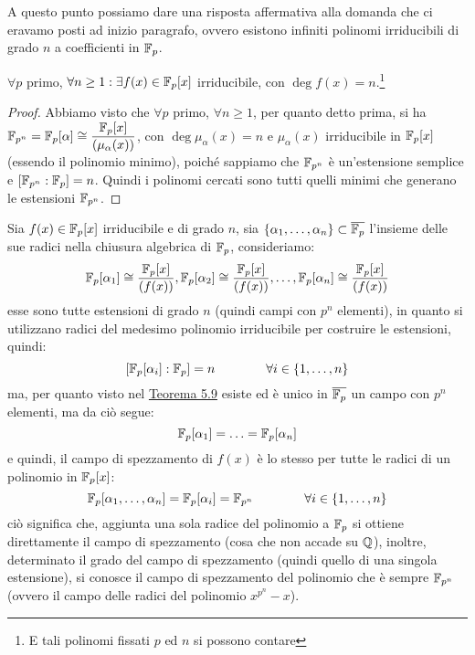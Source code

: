 \documentclass[11pt]{scrartcl}
\begin{document}
A questo punto possiamo dare una risposta affermativa alla domanda che ci eravamo posti ad inizio paragrafo, ovvero esistono infiniti
polinomi irriducibili di grado $n$ a coefficienti in ${\mathbb F}_p$.

\begin{corollary}
	$\forall p$ primo, $\forall n \geq 1: \exists f(x) \in {\mathbb F}_p[x]$ irriducibile, con $\deg f(x) = n$.\footnote{E tali polinomi fissati $p$ ed $n$ si possono contare}
\end{corollary}

\begin{proof}
	Abbiamo visto che $\forall p$ primo, $\forall n \geq 1$, per quanto detto prima, si ha $\mathbb{F}_{p^{n}} = {\mathbb F}_p[\alpha] \cong \displaystyle\frac{{\mathbb F}_p[x]}{(\mu_\alpha(x))}$,
	con $\deg\mu_\alpha(x)=n$ e $\mu_\alpha(x)$ irriducibile in ${\mathbb F}_p[x]$ (essendo il polinomio minimo), poiché sappiamo che $\mathbb{F}_{p^{n}}$ è un'estensione semplice e 
	$[\mathbb{F}_{p^{n}}:{\mathbb F}_p] = n$. Quindi i polinomi cercati sono tutti quelli minimi che generano le estensioni $\mathbb{F}_{p^{n}}$.
\end{proof}

\begin{remark}
Sia $f(x) \in {\mathbb F}_p[x]$ irriducibile e di grado $n$, sia $\{\alpha_1,\ldots,\alpha_n\} \subset \overline{{\mathbb F}_p}$
l'insieme delle sue radici nella chiusura algebrica di ${\mathbb F}_p$, consideriamo:
	\[ {\mathbb F}_p[\alpha_1] \cong \frac{{\mathbb F}_p[x]}{(f(x))}, {\mathbb F}_p[\alpha_2] \cong \frac{{\mathbb F}_p[x]}{(f(x))}, \ldots,
	{\mathbb F}_p[\alpha_n] \cong \frac{{\mathbb F}_p[x]}{(f(x))}
		\]
	esse sono tutte estensioni di grado $n$ (quindi campi con $p^n$ elementi), in quanto si utilizzano radici del medesimo polinomio irriducibile per costruire le estensioni, quindi:
		\[ [{\mathbb F}_p[\alpha_i] : {\mathbb F}_p] = n
		\qquad\qquad
		\forall i \in \{1,\ldots,n\}
			\] 
	ma, per quanto visto nel \hyperref[cf:5.9]{Teorema 5.9} esiste ed è unico in $\overline{{\mathbb F}_p}$ un campo con $p^n$ elementi, ma da ciò segue:
		\[{\mathbb F}_p[\alpha_1] = \ldots = {\mathbb F}_p[\alpha_n]
			\]
	e quindi, il campo di spezzamento di $f(x)$ è lo stesso per tutte le radici di un polinomio in ${\mathbb F}_p[x]$:
		\[ {\mathbb F}_p[\alpha_1,\ldots,\alpha_n] = {\mathbb F}_p[\alpha_i] = \mathbb{F}_{p^{n}}
		\qquad\qquad\forall i \in \{1,\ldots,n\}
			\]
	ciò significa che, aggiunta una sola radice del polinomio a ${\mathbb F}_p$ si ottiene direttamente il campo di spezzamento (cosa che non accade su $\mathbb Q$),
	inoltre, determinato il grado del campo di spezzamento (quindi quello di una singola estensione), si conosce il campo di spezzamento del polinomio che
	è sempre $\mathbb{F}_{p^{n}}$ (ovvero il campo delle radici del polinomio $x^{p^n} - x$).
\end{remark}
\end{document}
